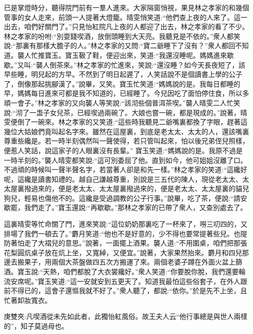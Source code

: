 \begin{parag}
    已是掌燈時分，聽得院門前有一羣人進來。大家隔窗悄視，果見林之孝家的和幾個管事的女人走來，前頭一人提著大燈籠。晴雯悄笑道:“他們查上夜的人來了。這一出去，咱們好關門了。”只見怡紅院凡上夜的人都迎了出去，林之孝家的看了不少。林之孝家的吩咐:“別耍錢喫酒，放倒頭睡到大天亮。我聽見是不依的。”衆人都笑說:“那裏有那樣大膽子的人。”林之孝家的又問:“寶二爺睡下了沒有？”衆人都回不知道。襲人忙推寶玉。寶玉靸了鞋，便迎出來，笑道:“我還沒睡呢。媽媽進來歇歇。”又叫:“襲人倒茶來。”林之孝家的忙進來，笑說:“還沒睡？如今天長夜短了，該早些睡，明兒起的方早。不然到了明日起遲了，人笑話說不是個讀書上學的公子了，倒像那起挑腳漢了。”說畢，又笑。寶玉忙笑道:“媽媽說的是。我每日都睡的早，媽媽每日進來可都是我不知道的，已經睡了。今兒因吃了面怕停住食，所以多頑一會子。”林之孝家的又向襲人等笑說:“該沏些個普洱茶喫。”襲人晴雯二人忙笑說:“沏了一盄子女兒茶，已經喫過兩碗了。大娘也嘗一碗，都是現成的。”說著，晴雯便倒了一碗來。林之孝家的又笑道:“這些時我聽見二爺嘴裏都換了字眼，趕著這幾位大姑娘們竟叫起名字來。雖然在這屋裏，到底是老太太、太太的人，還該嘴裏尊重些纔是。若一時半刻偶然叫一聲使得，若只管叫起來，怕以後兄弟侄兒照樣，便惹人笑話，說這家子的人眼裏沒有長輩。” 寶玉笑道:“媽媽說的是。我原不過是一時半刻的。”襲人晴雯都笑說:“這可別委屈了他。直到如今，他可姐姐沒離了口。不過頑的時候叫一聲半聲名字，若當著人卻是和先一樣。”林之孝家的笑道:“這纔好呢，這纔是讀書知禮的。越自己謙越尊重，別說是三五代的陳人，現從老太太、太太屋裏撥過來的，便是老太太、太太屋裏撥過來的，便是老太太、太太屋裏的貓兒狗兒，輕易也傷他不的。這纔是受過調教的公子行事。”說畢，吃了茶，便說:“請安歇罷，我們走了。”寶玉還說:“再歇歇。”那林之孝家的已帶了衆人，又查別處去了。
\end{parag}


\begin{parag}
    這裏晴雯等忙命關了門，進來笑說:“這位奶奶那裏吃了一杯來了，嘮三叨四的，又排場了我們一頓去了。”麝月笑道:“他也不是好意的，少不得也要常提著些兒。也隄防著怕走了大褶兒的意思。”說著，一面擺上酒果。襲人道:“不用圍桌，咱們把那張花梨圓炕桌子放在炕上坐，又寬綽，又便宜。”說著，大家果然抬來。麝月和四兒那邊去搬果子，用兩個大茶盤做四五次方搬運了來。兩個老婆子蹲在外面火盆上篩酒。寶玉說:“天熱，咱們都脫了大衣裳纔好。”衆人笑道:“你要脫你脫，我們還要輪流安席呢。”寶玉笑道:“這一安就安到五更天了。知道我最怕這些俗套子，在外人跟前不得已的，這會子還慪我就不好了。”衆人聽了，都說:“依你。”於是先不上坐，且忙著卸妝寬衣。\begin{note}庚雙夾:凡喫酒從未先如此者，此獨怡紅風俗。故王夫人云“他行事總是與世人兩樣的”，知子莫過母也。\end{note}
\end{parag}



